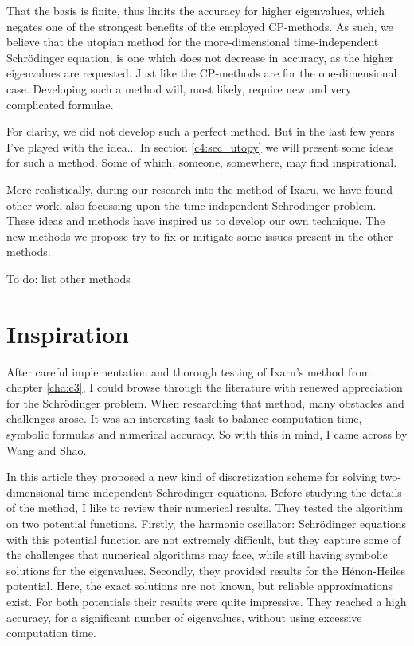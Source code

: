 That the basis is finite, thus limits the accuracy for higher eigenvalues, which negates one of the strongest benefits of the employed CP-methods. As such, we believe that the utopian method for the more-dimensional time-independent Schrödinger equation, is one which does not decrease in accuracy, as the higher eigenvalues are requested. Just like the CP-methods are for the one-dimensional case. Developing such a method will, most likely, require new and very complicated formulae.

For clarity, we did not develop such a perfect method. But in the last few years I've played with the idea... In section \ref{c4:sec_utopy} we will present some ideas for such a method. Some of which, someone, somewhere, may find inspirational.

More realistically, during our research into the method of Ixaru, we have found other work, also focussing upon the time-independent Schrödinger problem. These ideas and methods have inspired us to develop our own technique. The new methods we propose try to fix or mitigate some issues present in the other methods.

    {\color{red} To do: list other methods}

\section{Inspiration}

After careful implementation and thorough testing of Ixaru's method from chapter \ref{cha:c3}, I could browse through the literature with renewed appreciation for the Schrödinger problem. When researching that method, many obstacles and challenges arose. It was an interesting task to balance computation time, symbolic formulas and numerical accuracy. So with this in mind, I came across \cite{wang_new_2009} by Wang and Shao.

In this article they proposed a new kind of discretization scheme for solving two-dimensional time-independent Schrödinger equations. Before studying the details of the method, I like to review their numerical results. They tested the algorithm on two potential functions. Firstly, the harmonic oscillator: Schrödinger equations with this potential function are not extremely difficult, but they capture some of the challenges that numerical algorithms may face, while still having symbolic solutions for the eigenvalues. Secondly, they provided results for the Hénon-Heiles potential. Here, the exact solutions are not known, but reliable approximations exist. For both potentials their results were quite impressive. They reached a high accuracy, for a significant number of eigenvalues, without using excessive computation time.

